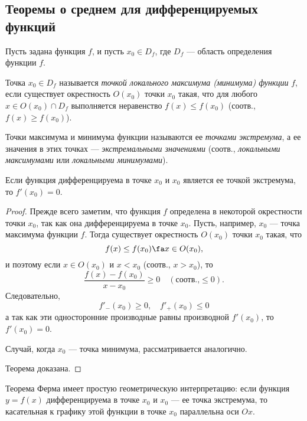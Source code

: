 \subsection{Теоремы о среднем для дифференцируемых функций}
Пусть задана функция $f$, и пусть $x_0 \in D_f$, где $D_f$ --- область определения функции $f$.
\begin{defn}
Точка $x_0 \in D_f$ называется \textit{точкой локального максимума \textup{(}минимума\textup{)} функции} $f$, если существует окрестность $O(x_0)$ точки $x_0$ такая, что для любого $x \in O(x_0)\cap D_f$ выполняется неравенство $f(x) \le f(x_0)$ (соотв., $f(x) \ge f(x_0)$).
\end{defn}
\begin{defn} Точки максимума и минимума функции называются ее \textit{точками экстремума}, а ее значения в этих точках --- \textit{экстремальными значениями} (соотв., \textit{локальными максимумами} или \textit{локальными минимумами}).
\end{defn}
\begin{thm}[Ферма]\label{ch4n1} 
Если функция дифференцируема в точке $x_0$ и $x_0$ является ее точкой экстремума, то $f'(x_0) = 0$.
\end{thm}
\begin{proof}
Прежде всего заметим, что функция $f$ определена в некоторой окрестности точки $x_0$, так как она дифференцируема в точке $x_0$. Пусть, например, $x_0$ --- точка максимума функции $f$. Тогда существует окрестность $O(x_0)$ точки $x_0$ такая, что 
$$
f(x) \le f(x_0) \fa x \in O(x_0),
$$
и поэтому если $x \in O(x_0)$ и $x < x_0$ (соотв., $x > x_0$), то
$$
\frac{f(x)-f(x_0)}{x-x_0}\ge0\quad (\text{соотв.,} \le 0).
$$
Следовательно,
$$
f'_{-}(x_0)\ge 0, \quad f'_{+}(x_0)\le 0
$$
а так как эти односторонние производные равны производной $f'(x_0)$,
то $f'(x_0) = 0$. 

Случай, когда $x_0$ --- точка минимума, рассматривается аналогично. 

\noindent 
Теорема доказана.
\end{proof}

Теорема Ферма имеет простую геометрическую интерпретацию:	если функция $y = f(x)$ дифференцируема в точке $x_0$ и $x_0$ --- ее точка экстремума, то касательная к графику этой функции в точке $x_0$ параллельна оси $Ox$. 

